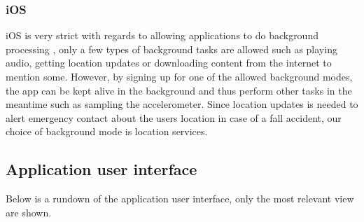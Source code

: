 \documentclass[12pt, a4paper, onecolumn]{article}
\begin{document}
	\subsubsection{iOS}
	iOS is very strict with regards to allowing applications to do background processing , only a few types of background tasks are allowed such as playing audio, getting location updates or downloading content from the internet to mention some. However, by signing up for one of the allowed background modes, the app can be kept alive in the background and thus perform other tasks in the meantime such as sampling the accelerometer. Since location updates is needed to alert emergency contact about the users location in case of a fall accident, our choice of background mode is location services.
	
\subsection{Application user interface}
	
	Below is a rundown of the application user interface, only the most relevant view are shown.
	
\end{document}

